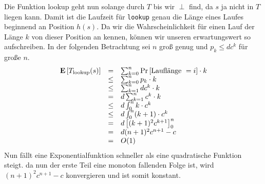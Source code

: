 \documentclass[11pt,a4paper,ngerman]{article}
\newcommand{\erw}[1]{\text{\bfseries E} \left[ #1 \right]}
\newcommand{\prob}[1]{\text{Pr}\left[ #1 \right]}
\begin{document}
Die Funktion lookup geht nun solange durch $T$ bis wir $\perp$ find, da $s$ ja nicht in $T$ liegen kann. Damit ist die Laufzeit für \lstinline|lookup| genau die Länge eines Laufes beginnend an Position $h(s)$. Da wir die Wahrscheinlichkeit für einen Lauf der Länge $k$ von dieser Position an kennen, können wir unseren erwartungswert so aufschreiben. In der folgenden Betrachtung sei $n$ groß genug und $p_k \leq d c^k$ für große $n$.
$$\begin{array}{rcl}
	\erw{T_\text{lookup}(s)} &=& \sum_{k=0}^n \prob{\text{Lauflänge }=i} \cdot k\\
					&\leq& \sum_{k=0}^n p_k \cdot k\\
					&\leq& \sum_{k=1}^n d c^k\cdot k\\
					&=& d \sum_{k=1}^n c^k \cdot k\\
					&\leq& d\int_0^{n} k \cdot c^k\\
					&\leq& d\int_0^{n} (k+1) \cdot c^k\\
					&=& d\left[ (k+1)^2 c^{k+1} \right]_0^{n}\\
					&=& d(n+1)^2 c^{n+1} - c\\
					&=& O(1)
\end{array}$$
Nun fällt eine Exponentialfunktion schneller als eine quadratische Funktion steigt. da nun der erste Teil eine monoton fallenden Folge ist, wird 
$(n+1)^2 c^{n+1} - c$ konvergieren und ist somit konstant.
\label{LastPage}
\end{document}
